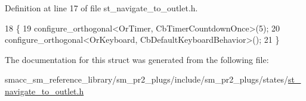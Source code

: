 Definition at line 17 of file st\+\_\+navigate\+\_\+to\+\_\+outlet.\+h.


\begin{DoxyCode}
18     \{
19         configure\_orthogonal<OrTimer, CbTimerCountdownOnce>(5);   
20         configure\_orthogonal<OrKeyboard, CbDefaultKeyboardBehavior>();
21     \}
\end{DoxyCode}


The documentation for this struct was generated from the following file\+:\begin{DoxyCompactItemize}
\item 
smacc\+\_\+sm\+\_\+reference\+\_\+library/sm\+\_\+pr2\+\_\+plugs/include/sm\+\_\+pr2\+\_\+plugs/states/\hyperlink{st__navigate__to__outlet_8h}{st\+\_\+navigate\+\_\+to\+\_\+outlet.\+h}\end{DoxyCompactItemize}
